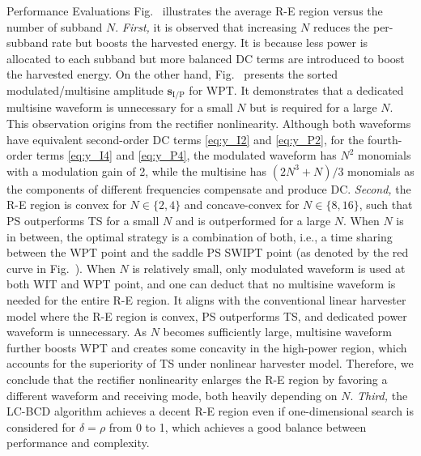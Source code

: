 \documentclass[journal]{IEEEtran}
\begin{document}
\begin{section}{Performance Evaluations}
		Fig.~ illustrates the average R-E region versus the number of subband $N$. \emph{First,} it is observed that increasing $N$ reduces the per-subband rate but boosts the harvested energy. It is because less power is allocated to each subband but more balanced DC terms are introduced to boost the harvested energy. On the other hand, Fig.~ presents the sorted modulated/multisine amplitude $\boldsymbol{s}_{\mathrm{I/P}}$ for WPT. It demonstrates that a dedicated multisine waveform is unnecessary for a small $N$ but is required for a large $N$. This observation origins from the rectifier nonlinearity. Although both waveforms have equivalent second-order DC terms \eqref{eq:y_I2} and \eqref{eq:y_P2}, for the fourth-order terms \eqref{eq:y_I4} and \eqref{eq:y_P4}, the modulated waveform has $N^2$ monomials with a modulation gain of \num{2}, while the multisine has $(2N^3+N)/3$ monomials as the components of different frequencies compensate and produce DC. \emph{Second,} the R-E region is convex for $N \in \{2,4\}$ and concave-convex for $N \in \{8,16\}$, such that PS outperforms TS for a small $N$ and is outperformed for a large $N$. When $N$ is in between, the optimal strategy is a combination of both, i.e., a time sharing between the WPT point and the saddle PS SWIPT point (as denoted by the red curve in Fig.~). When $N$ is relatively small, only modulated waveform is used at both WIT and WPT point, and one can deduct that no multisine waveform is needed for the entire R-E region. It aligns with the conventional linear harvester model where the R-E region is convex, PS outperforms TS, and dedicated power waveform is unnecessary. As $N$ becomes sufficiently large, multisine waveform further boosts WPT and creates some concavity in the high-power region, which accounts for the superiority of TS under nonlinear harvester model. Therefore, we conclude that the rectifier nonlinearity enlarges the R-E region by favoring a different waveform and receiving mode, both heavily depending on $N$. \emph{Third,} the LC-BCD algorithm achieves a decent R-E region even if one-dimensional search is considered for $\delta=\rho$ from \num{0} to \num{1}, which achieves a good balance between performance and complexity.


\end{section}
\end{document}
